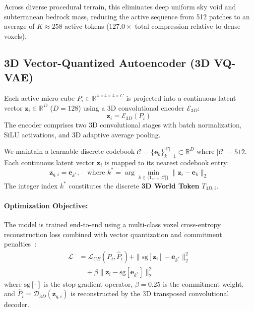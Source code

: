\documentclass[10pt,twocolumn,letterpaper]{article}
\begin{document}
Across diverse procedural terrain, this eliminates deep uniform sky void and subterranean bedrock mass, reducing the active sequence from 512 patches to an average of $K \approx 258$ active tokens ($127.0\times$ total compression relative to dense voxels).

\subsection{3D Vector-Quantized Autoencoder (3D VQ-VAE)}
Each active micro-cube $P_i \in \mathbb{R}^{4 \times 4 \times 4 \times C}$ is projected into a continuous latent vector $\mathbf{z}_i \in \mathbb{R}^D$ ($D = 128$) using a 3D convolutional encoder $\mathcal{E}_{3D}$:
\begin{equation}
\mathbf{z}_i = \mathcal{E}_{3D}(P_i)
\end{equation}
The encoder comprises two 3D convolutional stages with batch normalization, SiLU activations, and 3D adaptive average pooling.

We maintain a learnable discrete codebook $\mathcal{C} = \{\mathbf{e}_k\}_{k=1}^{|\mathcal{C}|} \subset \mathbb{R}^D$ where $|\mathcal{C}| = 512$. Each continuous latent vector $\mathbf{z}_i$ is mapped to its nearest codebook entry:
\begin{equation}
\mathbf{z}_{q, i} = \mathbf{e}_{k^*}, \quad \text{where } k^* = \arg\min_{k \in \{1, \dots, |\mathcal{C}|\}} \|\mathbf{z}_i - \mathbf{e}_k\|_2
\end{equation}
The integer index $k^*$ constitutes the discrete \textbf{3D World Token} $T_{3D, i}$.

\paragraph{Optimization Objective:} The model is trained end-to-end using a multi-class voxel cross-entropy reconstruction loss combined with vector quantization and commitment penalties~\cite{van2017neural}:
\begin{align}
\mathcal{L} &= \mathcal{L}_{CE}(P_i, \hat{P}_i) + \|\text{sg}[\mathbf{z}_i] - \mathbf{e}_{k^*}\|_2^2 \nonumber \\
&\quad + \beta \|\mathbf{z}_i - \text{sg}[\mathbf{e}_{k^*}]\|_2^2
\end{align}
where $\text{sg}[\cdot]$ is the stop-gradient operator, $\beta = 0.25$ is the commitment weight, and $\hat{P}_i = \mathcal{D}_{3D}(\mathbf{z}_{q, i})$ is reconstructed by the 3D transposed convolutional decoder.
\end{document}
